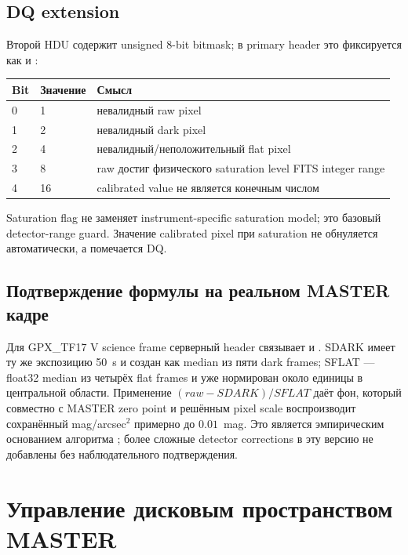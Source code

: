 \subsection{DQ extension}

Второй HDU  содержит unsigned 8-bit bitmask; в primary header это фиксируется как  и :

\begin{center}
\begin{tabular}{lll}
\toprule
Bit & Значение & Смысл \\
\midrule
0 & 1  & невалидный raw pixel \\
1 & 2  & невалидный dark pixel \\
2 & 4  & невалидный/неположительный flat pixel \\
3 & 8  & raw достиг физического saturation level FITS integer range \\
4 & 16 & calibrated value не является конечным числом \\
\bottomrule
\end{tabular}
\end{center}

Saturation flag не заменяет instrument-specific saturation model; это базовый detector-range guard. Значение calibrated pixel при saturation не обнуляется автоматически, а помечается DQ.

\subsection{Подтверждение формулы на реальном MASTER кадре}

Для GPX\_TF17 V science frame  серверный header связывает  и . SDARK имеет ту же экспозицию 50~s и создан как median из пяти dark frames; SFLAT --- float32 median из четырёх flat frames и уже нормирован около единицы в центральной области. Применение $(raw-SDARK)/SFLAT$ даёт фон, который совместно с MASTER zero point и решённым pixel scale воспроизводит сохранённый  mag/arcsec$^2$ примерно до $0.01$~mag. Это является эмпирическим основанием алгоритма ; более сложные detector corrections в эту версию не добавлены без наблюдательного подтверждения.


\section{Управление дисковым пространством MASTER}

